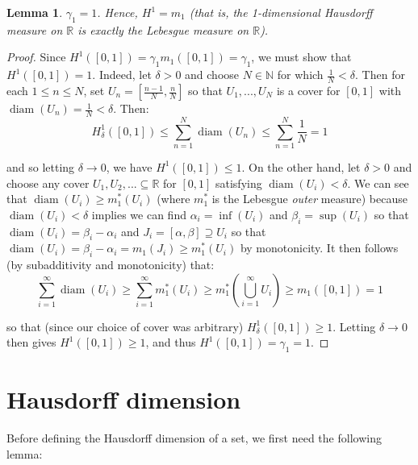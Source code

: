 \documentclass{article}[11pt]
\newcommand*{\R}{\mathbb{R}}
\newcommand*{\N}{\mathbb{N}}
\DeclareMathOperator*{\diam}{diam}
\theoremstyle{dotless}
\newtheorem{lem}[thm]{Lemma}
\begin{document}
\begin{lem}\label{gamma_1}
	$\gamma_1 = 1$. Hence, $H^1 = m_1$ (that is, the 1-dimensional Hausdorff measure on $\R$ is exactly the Lebesgue measure on $\R$).
\end{lem}
\begin{proof}
	Since $H^1([0,1]) = \gamma_1 m_1([0,1]) = \gamma_1$, we must show that $H^1([0,1]) = 1$.
	Indeed, let $\delta > 0$ and choose $N \in \N$ for which $\frac{1}{N} < \delta$. Then for each $1 \leqslant n \leqslant N$, set 
	$U_n = [\frac{n-1}{N}, \frac{n}{N}]$ so that $U_1, ..., U_N$ is a cover for $[0,1]$ with $\diam(U_n) = \frac{1}{N} < \delta$.
	Then:
	\[ H_\delta^1([0,1]) \leqslant \sum_{n=1}^N \diam(U_n) \leqslant \sum_{n=1}^N \frac{1}{N} = 1 \]
	
	\noindent
	and so letting $\delta \to 0$, we have $H^1([0,1]) \leqslant 1$. On the other hand, let $\delta > 0$ and
	choose any cover $U_1, U_2, ... \subseteq \R$ for $[0,1]$ satisfying $\diam(U_i) < \delta$. We can see that $\diam(U_i) \geqslant m_1^*(U_i)$
	(where $m_1^*$ is the Lebesgue \textit{outer} measure)
	because $\diam(U_i) < \delta$ implies we can find $\alpha_i = \inf(U_i)$ and $\beta_i = \sup(U_i)$ so that
	$\diam(U_i) = \beta_i - \alpha_i$ and $J_i = [\alpha, \beta] \supseteq U_i$ so that $\diam(U_i) = \beta_i - \alpha_i
	= m_1(J_i) \geqslant m_1^*(U_i)$ by monotonicity. It then follows (by subadditivity and monotonicity) that:
	\[ \sum_{i=1}^\infty \diam(U_i) \geqslant \sum_{i=1}^\infty m_1^*(U_i) \geqslant m_1^*\left( \bigcup_{i=1}^\infty U_i \right)
	\geqslant m_1([0,1]) = 1 \]
	
	\noindent
	so that (since our choice of cover was arbitrary) $H_\delta^1([0,1]) \geqslant 1$. Letting $\delta \to 0$ then gives
	$H^1([0,1]) \geqslant 1$, and thus $H^1([0,1]) = \gamma_1 = 1$.
\end{proof}

\section{Hausdorff dimension}

Before defining the Hausdorff dimension of a set, we first need the following lemma:
\end{document}
